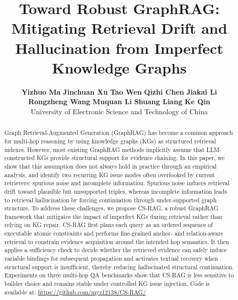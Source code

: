 \documentclass{article}
\title{Toward Robust GraphRAG: Mitigating Retrieval Drift and Hallucination from Imperfect Knowledge Graphs}
\author{
  \textbf{Yizhuo Ma} \quad
  \textbf{Jinchuan Xu} \quad
  \textbf{Tao Wen} \quad
  \textbf{Qizhi Chen} \quad
  \textbf{Jiakai Li} \\
  \textbf{Rongzheng Wang} \quad
  \textbf{Muquan Li} \quad
  \textbf{Shuang Liang} \quad
  \textbf{Ke Qin} \\
  University of Electronic Science and Technology of China
}
\theoremstyle{plain}
\theoremstyle{definition}
\theoremstyle{remark}
\begin{document}
\maketitle

\begin{abstract}


Graph Retrieval-Augmented Generation (GraphRAG) has become a common approach for multi-hop reasoning by using knowledge graphs (KGs) as structured retrieval indexes. However, most existing GraphRAG methods implicitly assume that LLM-constructed KGs provide structural support for evidence chaining. In this paper, we show that this assumption does not always hold in practice through an empirical analysis, and identify two recurring KG issue modes often overlooked by current retrievers: spurious noise and incomplete information. Spurious noise induces retrieval drift toward plausible but unsupported triples, whereas incomplete information leads to retrieval hallucination by forcing continuation through under-supported graph structure. To address these challenges, we propose CS-RAG, a robust GraphRAG framework that mitigates the impact of imperfect KGs during retrieval rather than relying on KG repair. CS-RAG first plans each query as an ordered sequence of executable atomic constraints and performs fine-grained anchor- and relation-aware retrieval to constrain evidence acquisition around the intended hop semantics. It then applies a sufficiency check to decide whether the retrieved evidence can safely induce variable bindings for subsequent propagation and activates textual recovery when structural support is insufficient, thereby reducing hallucinated structural continuation. Experiments on three multi-hop QA benchmarks show that CS-RAG is less sensitive to builder choice and remains stable under controlled KG issue injection.
Code is available at: \url{https://github.com/myz12138/CS-RAG/}
\end{abstract}
\end{document}
